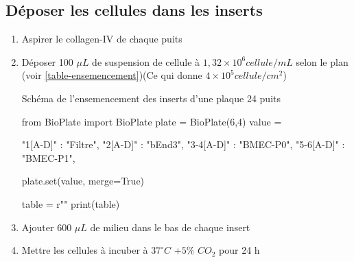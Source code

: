 \subsection{Déposer les cellules dans les inserts}

\begin{enumerate}
\item Aspirer le collagen-IV de chaque puits
\item Déposer 100 $\mu L$ de suspension de cellule à $1,32 \times 10^6 cellule/mL$ selon le plan (voir \ref{table-ensemencement})(Ce qui donne $4 \times 10^5 cellule/cm^2$)

\begin{table}[h]
\caption{Schéma de l'ensemencement des inserts d'une plaque 24 puits}
\begin{pycode}

from BioPlate import BioPlate
plate = BioPlate(6,4)
value = {
	"1[A-D]" : "Filtre",
	"2[A-D]" : "bEnd3",
	"3-4[A-D]" : "BMEC-P0",
	"5-6[A-D]" : "BMEC-P1",
	
}
plate.set(value, merge=True)

table = r""
print(table)
\end{pycode}
\label{table-ensemencement}
\end{table}
\item Ajouter 600 $\mu L$ de milieu dans le bas de chaque insert
\item Mettre les cellules à incuber à $37^\circ C$ +$5\%$ $CO_2$ pour 24 h

\end{enumerate}